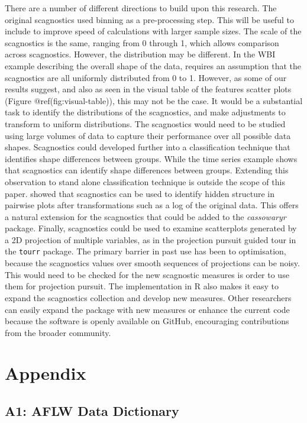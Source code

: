 There are a number of different directions to build upon this research.
The original scagnostics used binning as a pre-processing step. This
will be useful to include to improve speed of calculations with larger
sample sizes. The scale of the scagnostics is the same, ranging from 0
through 1, which allows comparison across scagnostics. However, the
distribution may be different. In the WBI example describing the overall
shape of the data, requires an assumption that the scagnostics are all
uniformly distributed from 0 to 1. However, as some of our results
suggest, and also as seen in the visual table of the features scatter
plots (Figure @ref(fig:visual-table)), this may not be the case. It
would be a substantial task to identify the distributions of the
scagnostics, and make adjustments to transform to uniform distributions.
The scagnostics would need to be studied using large volumes of data to
capture their performance over all possible data shapes. Scagnostics
could developed further into a classification technique that identifies
shape differences between groups. While the time series example shows
that scagnostics can identify shape differences between groups.
Extending this observation to stand alone classification technique is
outside the scope of this paper. \citet{hidscags} showed that
scagnostics can be used to identify hidden structure in pairwise plots
after transformations such as a log of the original data. This offers a
natural extension for the scagnostics that could be added to the
\emph{cassowaryr} package. Finally, scagnostics could be used to examine
scatterplots generated by a 2D projection of multiple variables, as in
the projection pursuit guided tour in the \texttt{tourr} package. The
primary barrier in past use has been to optimisation, because the
scagnostics values over smooth sequences of projections can be noisy.
This would need to be checked for the new scagnostic measures is order
to use them for projection pursuit. The implementation in R also makes
it easy to expand the scagnostics collection and develop new measures.
Other researchers can easily expand the package with new measures or
enhance the current code because the software is openly available on
GitHub, encouraging contributions from the broader community.

\hypertarget{appendix}{%
\section{Appendix}\label{appendix}}

\hypertarget{a1-aflw-data-dictionary}{%
\subsection{A1: AFLW Data Dictionary}\label{a1-aflw-data-dictionary}}

